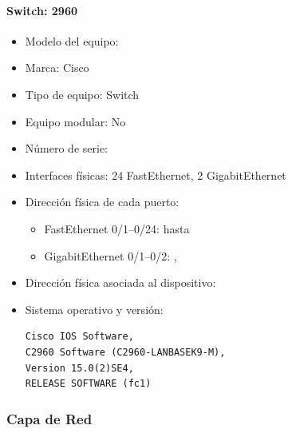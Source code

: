 \paragraph{Switch: 2960}
\begin{itemize}
  \item Modelo del equipo: 
  \item Marca: Cisco
  \item Tipo de equipo: Switch
  \item Equipo modular: No
  \item Número de serie: 
  \item Interfaces físicas: 24 FastEthernet, 2 GigabitEthernet
  \item Dirección física de cada puerto:
  \begin{itemize}
    \item FastEthernet 0/1–0/24:  hasta 
    \item GigabitEthernet 0/1–0/2: , 
  \end{itemize}
  \item Dirección física asociada al dispositivo:
  \item Sistema operativo y versión:
\begin{verbatim}
Cisco IOS Software,
C2960 Software (C2960-LANBASEK9-M),
Version 15.0(2)SE4,
RELEASE SOFTWARE (fc1)
\end{verbatim}
\end{itemize}

\subsubsection*{Capa de Red}

